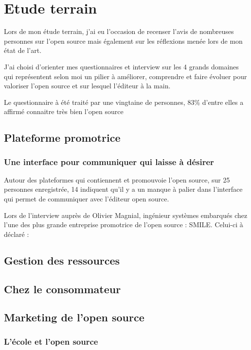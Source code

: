 \chapter{Etude terrain} %

Lors de mon étude terrain, j'ai eu l'occasion de recenser l'avis de nombreuses personnes sur l'open source mais également sur les réflexions menée lors de mon état de l'art.

J'ai choisi d'orienter mes questionnaires et interview sur les 4 grands domaines qui représentent selon moi un pilier à améliorer, comprendre et faire évoluer pour valoriser l'open source et sur lesquel l'éditeur à la main.

Le questionnaire à été traité par une vingtaine de personnes, 83\% d'entre elles a affirmé connaitre très bien l'open source 

	\section{Plateforme promotrice}

		\subsection{Une interface pour communiquer qui laisse à désirer}

			Autour des plateformes qui contiennent et promouvoie l'open source, sur 25 personnes enregistrée, 14 indiquent qu'il y a un manque à palier dans l'interface qui permet de communiquer avec l'éditeur open source. 

			Lors de l'interview auprès de Olivier Magnial, ingénieur systèmes embarqués chez l'une des plus grande entreprise promotrice de l'open source : SMILE. Celui-ci à déclaré : 

\begin{center}
	\textit{
	}
\end{center}

	\section{Gestion des ressources}
	\section{Chez le consommateur}
	\section{Marketing de l'open source}

		\subsection{L'école et l'open source}